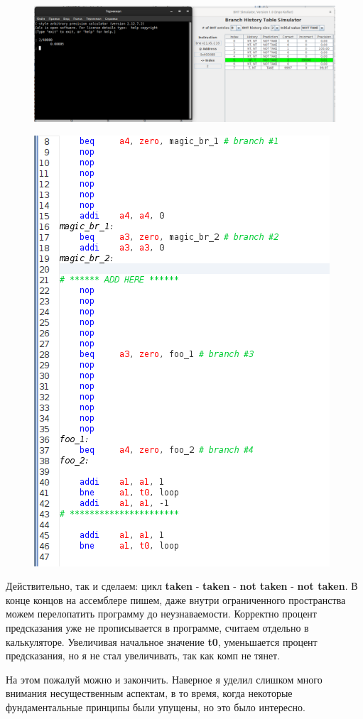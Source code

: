 \begin{enumerate}
\begin{figure}[H]
    \centering
    \includegraphics[width=0.75\linewidth]{Formal/BHT4.png}
\end{figure}
\begin{figure}[H]
    \centering
    \includegraphics[width=0.75\linewidth]{Formal/task4.png}
\end{figure}
Действительно, так и сделаем: цикл \textbf{taken} - \textbf{taken} - \textbf{not taken} - \textbf{not taken}.
В конце концов на ассемблере пишем, даже внутри ограниченного пространства можем перелопатить программу до неузнаваемости. Корректно процент предсказания уже не прописывается в программе, считаем отдельно в калькуляторе. Увеличивая начальное значение \textbf{t0}, уменьшается процент предсказания, но я не стал увеличивать, так как комп не тянет. 
\end{enumerate}




На этом пожалуй можно и закончить. Наверное я уделил слишком много внимания несущественным аспектам, в то время, когда некоторые фундаментальные принципы были упущены, но это было интересно. 



